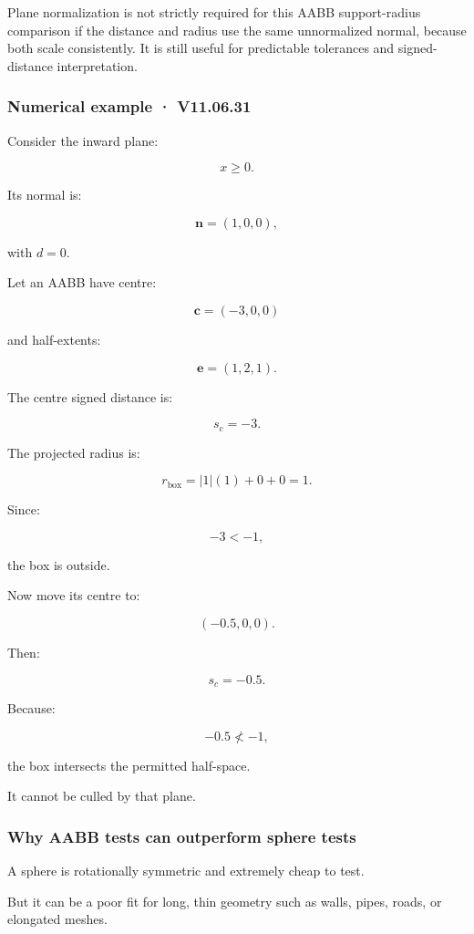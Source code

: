Plane normalization is not strictly required for this AABB support-radius comparison if the distance and radius use the same unnormalized normal, because both scale consistently. It is still useful for predictable tolerances and signed-distance interpretation.

\subsubsection{Numerical example · V11.06.31}\label{numerical-example-v11.06.31}

Consider the inward plane:

\[
 x\ge0.
\]

Its normal is:

\[
 \mathbf n=(1,0,0),
\]

with \(d=0\).

Let an AABB have centre:

\[
 \mathbf c=(-3,0,0)
\]

and half-extents:

\[
 \mathbf e=(1,2,1).
\]

The centre signed distance is:

\[
 s_c=-3.
\]

The projected radius is:

\[
 r_{\mathrm{box}}= |1|(1)+0+0=1.
\]

Since:

\[
 -3<-1,
\]

the box is outside.

Now move its centre to:

\[
 (-0.5,0,0).
\]

Then:

\[
 s_c=-0.5.
\]

Because:

\[
 -0.5\not<-1,
\]

the box intersects the permitted half-space.

It cannot be culled by that plane.

\subsubsection{Why AABB tests can outperform sphere tests}\label{why-aabb-tests-can-outperform-sphere-tests}

A sphere is rotationally symmetric and extremely cheap to test.

But it can be a poor fit for long, thin geometry such as walls, pipes, roads, or elongated meshes.

